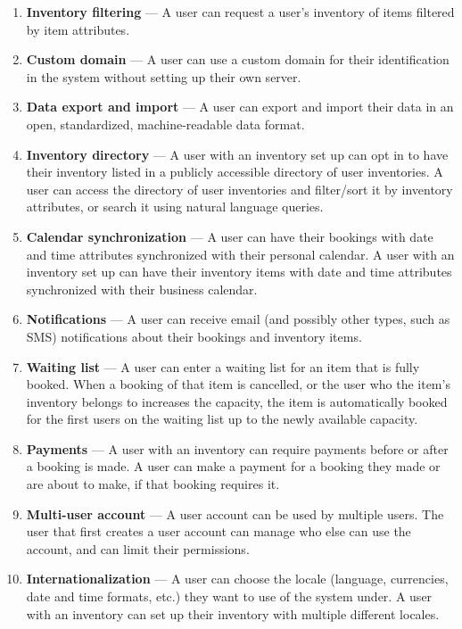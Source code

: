 \begin{enumerate}[label=\textbf{F\arabic*}, ref=\labelenumi]
    \item \label{req:filtering} \textbf{Inventory filtering} --- A user can request a user's inventory of items filtered by item attributes.
    \item \label{req:custom_domain} \textbf{Custom domain} --- A user can use a custom domain for their identification in the system without setting up their own server.
    \item \label{req:data_exim} \textbf{Data export and import} --- A user can export and import their data in an open, standardized, machine-readable data format.
    \item \label{req:directory} \textbf{Inventory directory} --- A user with an inventory set up can opt in to have their inventory listed in a publicly accessible directory of user inventories. A user can access the directory of user inventories and filter/sort it by inventory attributes, or search it using natural language queries.
    \item \label{req:calendar_sync} \textbf{Calendar synchronization} --- A user can have their bookings with date and time attributes synchronized with their personal calendar. A user with an inventory set up can have their inventory items with date and time attributes synchronized with their business calendar.
    \item \label{req:notifications} \textbf{Notifications} --- A user can receive email (and possibly other types, such as SMS) notifications about their bookings and inventory items.
    \item \label{req:waitlist} \textbf{Waiting list} --- A user can enter a waiting list for an item that is fully booked. When a booking of that item is cancelled, or the user who the item's inventory belongs to increases the capacity, the item is automatically booked for the first users on the waiting list up to the newly available capacity.
    \item \label{req:payments} \textbf{Payments} --- A user with an inventory can require payments before or after a booking is made. A user can make a payment for a booking they made or are about to make, if that booking requires it.
    \item \label{req:multiuser_account} \textbf{Multi-user account} --- A user account can be used by multiple users. The user that first creates a user account can manage who else can use the account, and can limit their permissions.
    \item \label{req:internationalization} \textbf{Internationalization} --- A user can choose the locale (language, currencies, date and time formats, etc.) they want to use of the system under. A user with an inventory can set up their inventory with multiple different locales.

\end{enumerate}
